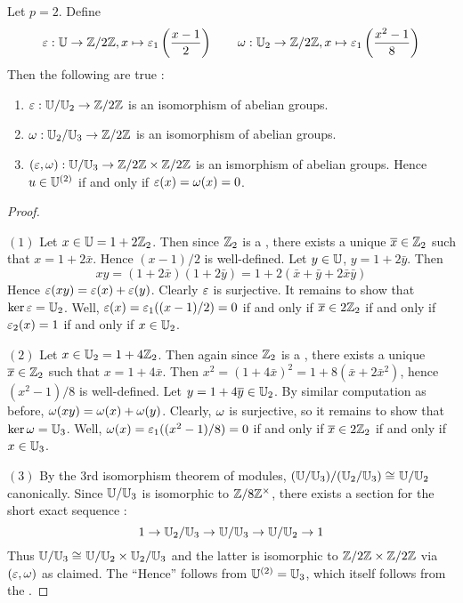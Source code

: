 \begin{prop}
  
  Let $p = 2$. 
  Define \begin{align*}
    \varepsilon : \mathbb{U} \to \mathbb{Z}/2\mathbb{Z}, x \mapsto \varepsilon_1\left(\frac{x - 1}{2}\right)
    \quad\quad 
    \omega : \mathbb{U}_2 \to \mathbb{Z}/2\mathbb{Z}, x \mapsto \varepsilon_1\left(\frac{x^2 - 1}{8}\right)
  \end{align*}
  Then the following are true : 
  \begin{enumerate}
    \item $\varepsilon : \mathbb{U}/\mathbb{U}_2 \to \mathbb{Z}/2\mathbb{Z}$
    is an isomorphism of abelian groups. 
    \item $\omega : \mathbb{U}_2/\mathbb{U}_3 \to \mathbb{Z}/2\mathbb{Z}$ is an isomorphism of abelian groups. 
    \item $(\varepsilon,\omega) : \mathbb{U}/\mathbb{U}_3 \to \mathbb{Z}/2\mathbb{Z} \times \mathbb{Z}/2\mathbb{Z}$
    is an ismorphism of abelian groups. 
    Hence $u \in \mathbb{U}^{(2)}$ if and only if $\varepsilon(x) = \omega(x) = 0$.
  \end{enumerate}
\end{prop}
\begin{proof}~
  
  $(1)$ Let $x \in \mathbb{U} = 1 + 2\mathbb{Z}_2$.
  Then since $\mathbb{Z}_2$ is a , 
  there exists a unique $\overline{x} \in \mathbb{Z}_2$
  such that $x = 1 + 2\bar{x}$.
  Hence $(x - 1)/2$ is well-defined. 
  Let $y \in \mathbb{U}$, $y = 1 + 2 \bar{y}$. 
  Then \[
    x y = (1 + 2 \bar{x})(1 + 2\bar{y}) 
    = 1 + 2 (\bar{x} + \bar{y} + 2\bar{x}\bar{y})
  \]
  Hence $\varepsilon(x y) = \varepsilon(x) + \varepsilon(y)$. 
  Clearly $\varepsilon$ is surjective. 
  It remains to show that $\ker\varepsilon = \mathbb{U}_2$.
  Well, $\varepsilon(x) = \varepsilon_1((x-1)/2) = 0$ if and only if 
  $\overline{x} \in 2\mathbb{Z}_2$ if and only if 
  $\varepsilon_2(x) = 1$ if and only if $x \in \mathbb{U}_2$. 

  $(2)$ Let $x \in \mathbb{U}_2 = 1 + 4 \mathbb{Z}_2$. 
  Then again since $\mathbb{Z}_2$ is a ,
  there exists a unique $\overline{x} \in \mathbb{Z}_2$
  such that $x = 1 + 4\bar{x}$.
  Then $x^2 = (1 + 4\bar{x})^2 = 1 + 8(\bar{x} + 2\bar{x}^2)$,
  hence $(x^2 - 1)/8$ is well-defined. 
  Let $y = 1 + 4 \overline{y} \in \mathbb{U}_2$.
  By similar computation as before, $\omega(x y) = \omega(x) + \omega(y)$. 
  Clearly, $\omega$ is surjective,
  so it remains to show that $\ker\omega = \mathbb{U}_3$.
  Well, $\omega(x) = \varepsilon_1((x^2 - 1 )/ 8) = 0$ if and only if 
  $\overline{x} \in 2\mathbb{Z}_2$ if and only if 
  $x \in \mathbb{U}_3$. 

  $(3)$ By the 3rd isomorphism theorem of modules, 
  $(\mathbb{U}/\mathbb{U}_3)/(\mathbb{U}_2/\mathbb{U}_3) \cong_{} \mathbb{U}/\mathbb{U}_2$ canonically.
  Since $\mathbb{U}/\mathbb{U}_3$ is isomorphic to $\mathbb{Z}/8\mathbb{Z}^\times$,
  there exists a section for the short exact sequence : 
  \[
    1 \to \mathbb{U}_2/\mathbb{U}_3 \to \mathbb{U}/\mathbb{U}_3 \to \mathbb{U}/\mathbb{U}_2 \to 1
  \]
  Thus $\mathbb{U}/\mathbb{U}_3 \cong_{} \mathbb{U}/\mathbb{U}_2 \times \mathbb{U}_2/\mathbb{U}_3$
  and the latter is isomorphic to $\mathbb{Z}/2\mathbb{Z} \times \mathbb{Z}/2\mathbb{Z}$ via 
  $(\varepsilon,\omega)$ as claimed. 
  The ``Hence'' follows from $\mathbb{U}^{(2)} = \mathbb{U}_3$,
  which itself follows from the 
  . 

\end{proof}

